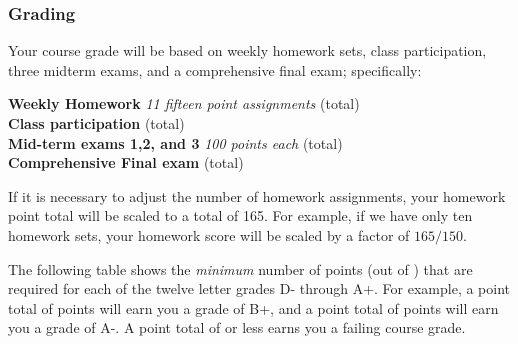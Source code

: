 \documentclass[12pt]{article}
\newcounter{ex}\setcounter{ex}{0}
\newenvironment{mypar}[2]
  {\begin{list}{}%
    {\setlength\leftmargin{#1}
    \setlength\rightmargin{#2}}
    \item[]}
  {\end{list}}
\begin{document}
\subsubsection*{Grading}

Your course grade will be based on weekly homework sets, class participation,
three midterm exams, and a comprehensive 
final exam; specifically:
\begin{mypar}{0.25in}{0.25in}
    \textbf{Weekly Homework}  \emph{11 fifteen point assignments}   (total) \\
    \textbf{Class participation}  (total) \\
    \textbf{Mid-term exams 1,2, and 3} \emph{100 points each}  (total)\\
    \textbf{Comprehensive Final exam}  (total)
\end{mypar}
If it is necessary to adjust the number of  homework assignments,  your homework point 
total will be scaled to a total of 165.  For example, if we have only ten homework sets, 
your homework score will be scaled by a factor of \(165/150\).





The following table shows the \emph{minimum} number of points (out of \points) that
are required for each of the twelve letter grades D- through A+. For
example, a point total of \Bp\/  points will earn you a grade of B+,  and 
a point total of \Am\/ points will earn you a grade of A-. A point
total of \F\/  or less earns you a failing course grade.
 
\end{document}

